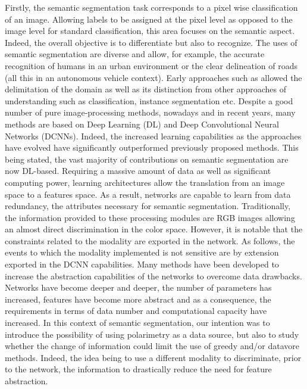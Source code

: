 Firstly, the semantic segmentation task corresponds to a pixel wise classification of an image. Allowing labels to be assigned at the pixel level as opposed to the image level for standard classification, this area focuses on the semantic aspect. Indeed, the overall objective is to differentiate but also to recognize. The uses of semantic segmentation are diverse and allow, for example, the accurate recognition of humans in an urban environment or the clear delineation of roads (all this in an autonomous vehicle context).
Early approaches such as \cite{ohta1978analysis} allowed the delimitation of the domain as well as its distinction from other approaches of understanding such as classification\cite{agin1980computer}, instance segmentation\cite{edelman1989integrating} etc. Despite a good number of pure image-processing methods, nowadays and in recent years, many methods are based on Deep Learning (DL) and Deep Convolutional Neural Networks (DCNNs). Indeed, the increased learning capabilities as the approaches have evolved have significantly outperformed previously proposed methods. This being stated, the vast majority of contributions on semantic segmentation are now DL-based. 
Requiring a massive amount of data as well as significant computing power, learning architectures allow the translation from an image space to a features space. As a result, networks are capable to learn from data redundancy, the attributes necessary for semantic segmentation. Traditionally, the information provided to these processing modules are RGB images allowing an almost direct discrimination in the color space. However, it is notable that the constraints related to the modality are exported in the network. As follows, the events to which the modality implemented is not sensitive are by extension exported in the DCNN capabilities. 
Many methods have been developed to increase the abstraction capabilities of the networks to overcome data drawbacks. Networks have become deeper and deeper, the number of parameters has increased, features have become more abstract and as a consequence, the requirements in terms of data number and computational capacity have increased.
In this context of semantic segmentation, our intention was to introduce the possibility of using polarimetry as a data source, but also to study whether the change of information could limit the use of greedy and/or datavore methods. Indeed, the idea being to use a different modality to discriminate, prior to the network, the information to drastically reduce the need for feature abstraction.


